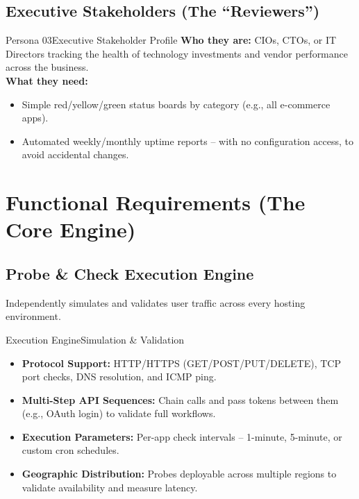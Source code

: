 \documentclass[11pt,a4paper]{article}
\begin{document}
\subsection{Executive Stakeholders (The ``Reviewers'')}
\begin{recbox}{Persona 03}{Executive Stakeholder Profile}
\textbf{Who they are:} CIOs, CTOs, or IT Directors tracking the health of technology investments and vendor performance across the business.\\[8pt]
\textbf{What they need:}
\begin{itemize}
  \item Simple red/yellow/green status boards by category (e.g., all e-commerce apps).
  \item Automated weekly/monthly uptime reports -- with no configuration access, to avoid accidental changes.
\end{itemize}
\end{recbox}

\section{Functional Requirements (The Core Engine)}

\subsection{Probe \& Check Execution Engine}
Independently simulates and validates user traffic across every hosting environment.

\begin{recbox}{Execution Engine}{Simulation \& Validation}
\begin{itemize}
  \item \textbf{Protocol Support:} HTTP/HTTPS (GET/POST/PUT/DELETE), TCP port checks, DNS resolution, and ICMP ping.
  \item \textbf{Multi-Step API Sequences:} Chain calls and pass tokens between them (e.g., OAuth login) to validate full workflows.
  \item \textbf{Execution Parameters:} Per-app check intervals -- 1-minute, 5-minute, or custom cron schedules.
  \item \textbf{Geographic Distribution:} Probes deployable across multiple regions to validate availability and measure latency.
\end{itemize}
\end{recbox}
\end{document}
